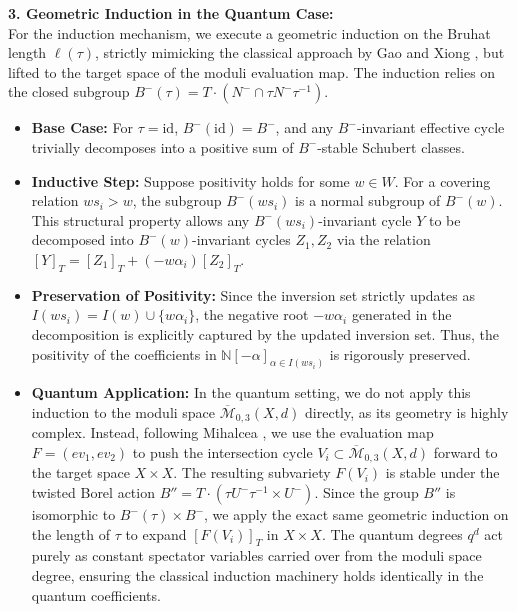 \documentclass{amsart}
\theoremstyle{definition}
\begin{document}
\vspace{2mm}
\noindent\textbf{3. Geometric Induction in the Quantum Case:}\\
For the induction mechanism, we execute a geometric induction on the Bruhat length $\ell(\tau)$, strictly mimicking the classical approach by Gao and Xiong \cite{GaoXiong2023}, but lifted to the target space of the moduli evaluation map. 
The induction relies on the closed subgroup $B^-(\tau) = T \cdot (N^- \cap \tau N^- \tau^{-1})$. 
\begin{itemize}
    \item \textbf{Base Case:} For $\tau = \mathrm{id}$, $B^-(\mathrm{id}) = B^-$, and any $B^-$-invariant effective cycle trivially decomposes into a positive sum of $B^-$-stable Schubert classes.
    \item \textbf{Inductive Step:} Suppose positivity holds for some $w \in W$. For a covering relation $w s_i > w$, the subgroup $B^-(ws_i)$ is a normal subgroup of $B^-(w)$. This structural property allows any $B^-(ws_i)$-invariant cycle $Y$ to be decomposed into $B^-(w)$-invariant cycles $Z_1, Z_2$ via the relation $[Y]_T = [Z_1]_T + (-w\alpha_i)[Z_2]_T$. 
    \item \textbf{Preservation of Positivity:} Since the inversion set strictly updates as $I(ws_i) = I(w) \cup \{w\alpha_i\}$, the negative root $-w\alpha_i$ generated in the decomposition is explicitly captured by the updated inversion set. Thus, the positivity of the coefficients in $\mathbb{N}[-\alpha]_{\alpha \in I(ws_i)}$ is rigorously preserved.
    \item \textbf{Quantum Application:} In the quantum setting, we do not apply this induction to the moduli space $\overline{\mathcal{M}}_{0,3}(X,d)$ directly, as its geometry is highly complex. Instead, following Mihalcea \cite{Mihalcea2006}, we use the evaluation map $F = (ev_1, ev_2)$ to push the intersection cycle $V_i \subset \overline{\mathcal{M}}_{0,3}(X,d)$ forward to the target space $X \times X$. The resulting subvariety $F(V_i)$ is stable under the twisted Borel action $B'' = T \cdot (\tau U^- \tau^{-1} \times U^-)$. Since the group $B''$ is isomorphic to $B^-(\tau) \times B^-$, we apply the exact same geometric induction on the length of $\tau$ to expand $[F(V_i)]_T$ in $X \times X$. The quantum degrees $q^d$ act purely as constant spectator variables carried over from the moduli space degree, ensuring the classical induction machinery holds identically in the quantum coefficients.
\end{itemize}
\end{document}
